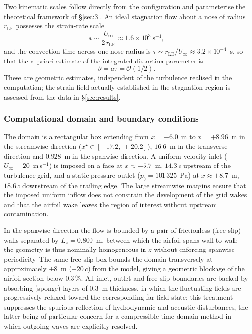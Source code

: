 \documentclass[lineno]{JFM-FLM_Au}
\begin{document}
Two kinematic scales follow directly from the configuration and
parameterise the theoretical framework of \S\ref{sec:3}. An ideal
stagnation flow about a nose of radius $r_{\mathrm{LE}}$ possesses
the strain-rate scale
\begin{equation}
  a \sim \frac{U_{\infty}}{2\,r_{\mathrm{LE}}}
    \approx 1.6\times10^{3}~\mathrm{s}^{-1},
  \label{eq:strain_scale}
\end{equation}
and the convection time across one nose radius is
$\tau \sim r_{\mathrm{LE}}/U_{\infty} \approx 3.2\times10^{-4}$~s, so
that the a~priori estimate of the integrated distortion parameter is
\begin{equation}
  \vartheta = a\tau = \mathcal{O}(1/2).
  \label{eq:vartheta_estimate}
\end{equation}
These are geometric estimates, independent of the turbulence realised
in the computation; the strain field actually established in the
stagnation region is assessed from the data in \S\ref{sec:results}.

\subsubsection{Computational domain and boundary conditions}

The domain is a rectangular box extending from $x = -6.0$~m to
$x = +8.96$~m in the streamwise direction
($x^{\star} \in [-17.2,\,+20.2]$), $16.6$~m in the transverse
direction and $0.928$~m in the spanwise direction. A uniform velocity
inlet ($U_{\infty} = 20$~m\,s$^{-1}$) is imposed on a face at
$x \approx -5.7$~m, $14.3\,c$ upstream of the turbulence grid, and a
static-pressure outlet ($p_0 = 101\,325$~Pa) at $x \approx +8.7$~m,
$18.6\,c$ downstream of the trailing edge. The large streamwise
margins ensure that the imposed uniform inflow does not constrain the
development of the grid wakes and that the airfoil wake leaves the
region of interest without upstream contamination.

In the spanwise direction the flow is bounded by a pair of
frictionless (free-slip) walls separated by $L_z = 0.800$~m, between
which the airfoil spans wall to wall; the geometry is thus nominally
homogeneous in $z$ without enforcing spanwise periodicity. The same
free-slip box bounds the domain transversely at approximately
$\pm 8$~m ($\pm 20\,c$) from the model, giving a geometric blockage
of the airfoil section below $0.3\,\%$. All inlet, outlet and
free-slip boundaries are backed by absorbing (sponge) layers of
$0.3$~m thickness, in which the fluctuating fields are progressively
relaxed toward the corresponding far-field state; this treatment
suppresses the spurious reflection of hydrodynamic and acoustic
disturbances, the latter being of particular concern for a
compressible time-domain method in which outgoing waves are
explicitly resolved.
\end{document}
